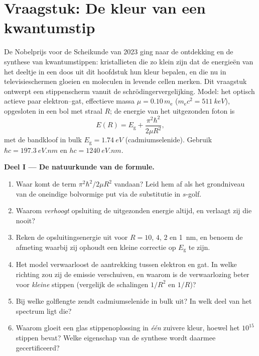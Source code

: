 \section{Vraagstuk: De kleur van een kwantumstip}

\begin{problem}\label{pb:b3:schrodinger-three-dimensions:1}
De Nobelprijs voor de Scheikunde van 2023 ging naar de ontdekking en de
synthese van kwantumstippen: kristallieten die zo klein zijn dat de
energieën van het deeltje in een doos uit dit hoofdstuk hun kleur
bepalen, en die nu in televisieschermen gloeien en moleculen in levende
cellen merken. Dit vraagstuk ontwerpt een stippenscherm vanuit de
schrödingervergelijking. Model: het optisch actieve paar elektron--gat,
effectieve massa $\mu = 0.10\,m_{\text{e}}$ ($m_{\text{e}}c^2 = \qty{511}{keV}$), opgesloten in een bol met straal $R$; de energie van het
uitgezonden foton is
\[
E(R) = E_{\text{g}} + \frac{\pi^2\hbar^2}{2\mu R^2} ,
\]
met de bandkloof in bulk $E_{\text{g}} = \qty{1.74}{eV}$
(cadmiumselenide). Gebruik $\hbar c = \qty{197.3}{eV.nm}$ en $hc =
\qty{1240}{eV.nm}$.

\medskip\noindent\textbf{Deel I --- De natuurkunde van de formule.}
\begin{enumerate}
  \item Waar komt de term $\pi^2\hbar^2/2\mu R^2$ vandaan? Leid hem af
        als het grondniveau van de oneindige bolvormige put via de
        substitutie in $s$-golf.
  \item Waarom \emph{verhoogt} opsluiting de uitgezonden energie altijd,
        en verlaagt zij die nooit?
  \item Reken de opsluitingsenergie uit voor $R = 10$, $4$, $2$ en
        \qty{1}{nm}, en benoem de afmeting waarbij zij ophoudt een
        kleine correctie op $E_{\text{g}}$ te zijn.
  \item Het model verwaarloost de aantrekking tussen elektron en gat. In
        welke richting zou zij de emissie verschuiven, en waarom is de
        verwaarlozing beter voor \emph{kleine} stippen (vergelijk de
        schalingen $1/R^2$ en $1/R$)?
  \item Bij welke golflengte zendt cadmiumselenide in bulk uit? In welk
        deel van het spectrum ligt die?
  \item Waarom gloeit een glas stippenoplossing in \emph{één} zuivere
        kleur, hoewel het $10^{15}$ stippen bevat? Welke eigenschap van
        de synthese wordt daarmee gecertificeerd?
\end{enumerate}


\end{problem}
